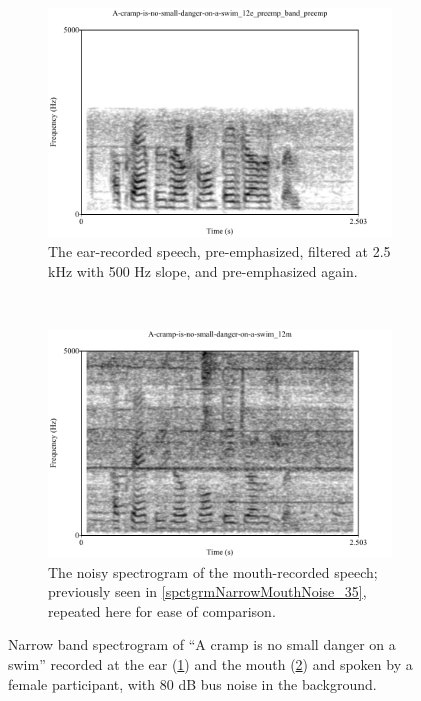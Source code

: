 \begin{figure}[H]
\centering
\begin{subfigure}{\textwidth}
  \centering
  \includegraphics[width=0.8\linewidth]{figure/spctgrmNarrowEarNoisePrempFiltPremp.pdf}
  \caption{The ear-recorded speech, pre-emphasized, filtered at 2.5 kHz with 500 Hz slope, and pre-emphasized again.}
  \label{spctgrmNarrowEarNoisePrempFiltPremp_35}
\end{subfigure}%
\\[2ex]
\begin{subfigure}{\textwidth}
  \centering
  \includegraphics[width=0.8\linewidth]{figure/spctgrmNarrowMthNoise_35.pdf}
  \caption{The noisy spectrogram of the mouth-recorded speech; previously seen in \ref{spctgrmNarrowMouthNoise_35}, repeated here for ease of comparison.}
  \label{spctgrmNarrowMouthNoise_35_compare}
\end{subfigure}
\caption{Narrow band spectrogram of ``A cramp is no small danger on a swim'' recorded at the ear (\ref{spctgrmNarrowEarNoisePrempFiltPremp_35}) and the mouth (\ref{spctgrmNarrowMouthNoise_35_compare}) and spoken by a female participant, with 80 dB bus noise in the background.}
\label{fig:ear_pfp}
\end{figure}

